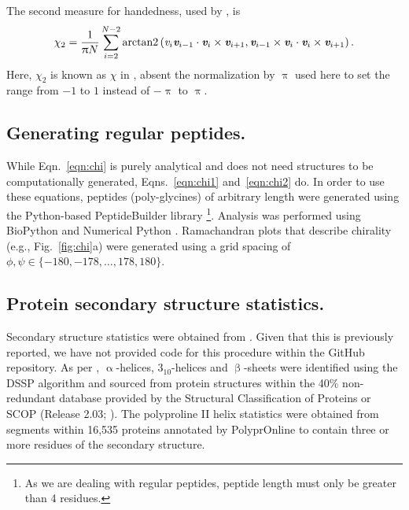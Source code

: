 \documentclass[fleqn,10pt]{wlpeerj} %
\newcommand{\Fig}[1]{Fig.~\ref{#1}}
\newcommand{\Eqn}[1]{Eqn.~\ref{#1}}
\newcommand{\Eqns}[1]{Eqns.~\ref{#1}}
\begin{document}
The second measure for handedness, used by \cite{Gruziel2013}, is
\begin{equation}\label{eqn:chi2}
\displaystyle \chi_2 = \frac{1}{\uppi N}\sum_{i = 2}^{N-2}
 \textrm{arctan2}\left (\textit{v}_i \textit{\textbf{v}}_{i-1} \cdot \textit{\textbf{v}}_i \times \textit{\textbf{v}}_{i+1},\textit{\textbf{v}}_{i-1}\times \textit{\textbf{v}}_i \cdot \textit{\textbf{v}}_i\times \textit{\textbf{v}}_{i+1} \right ).
\end{equation}
Here, $\chi_2$ is known as $\chi$ in \cite{Gruziel2013}, absent the normalization by $\uppi$ used here to set the range from $-1$ to $1$ instead of $-\uppi$ to $\uppi$. %

\subsection*{Generating regular peptides.}
While \Eqn{eqn:chi} is purely analytical and does not need structures to be computationally generated, \Eqns{eqn:chi1} and~\ref{eqn:chi2} do. In order to use these equations, peptides (poly-glycines) of arbitrary length were generated using the Python-based PeptideBuilder library \citep{Matthew2013}\footnote{As we are dealing with regular peptides, peptide length must only be greater than 4 residues.}. Analysis was performed using BioPython \citep{Cock2009} and Numerical Python \citep{VanDerWalt2011}. Ramachandran plots that describe chirality (e.g., \Fig{fig:chi}a) were generated using a grid spacing of $\phi,\psi \in \{-180,-178,\ldots,178,180\}$.

\subsection*{Protein secondary structure statistics.} 
Secondary structure statistics were obtained from \cite{MannigeKunduWhitelam2016}. Given that this is previously reported, we have not provided code for this procedure within the GitHub repository. As per \cite{MannigeKunduWhitelam2016}, $\upalpha$-helices, $3_{10}$-helices and $\upbeta$-sheets were identified using the DSSP algorithm \citep{Zhao2005,Kabsch1983,Joosten2011} and sourced from protein structures within the 40\% non-redundant database provided by the Structural Classification of Proteins or SCOP (Release 2.03; \cite{Fox2014}). The polyproline II helix statistics were obtained from segments within 16,535 proteins annotated by PolyprOnline \citep{Chebrek2014} to contain three or more residues of the secondary structure.
\end{document}
